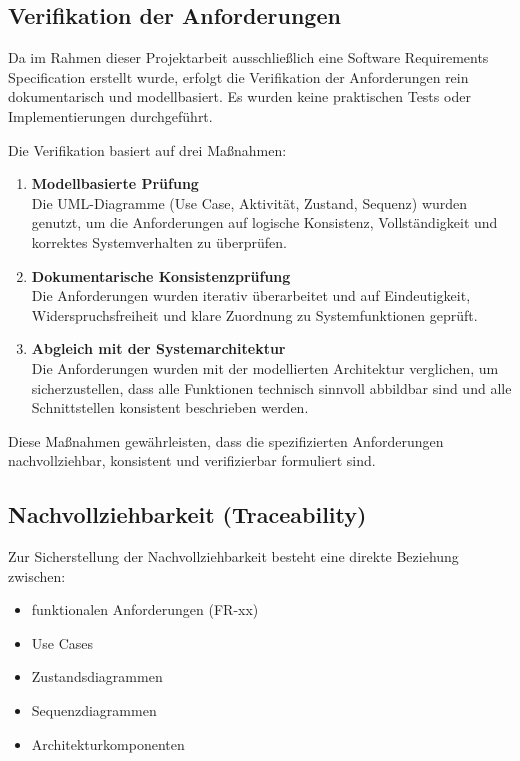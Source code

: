 \subsection{Verifikation der Anforderungen}

Da im Rahmen dieser Projektarbeit ausschließlich eine Software Requirements Specification erstellt wurde, erfolgt die Verifikation der Anforderungen rein dokumentarisch und modellbasiert. Es wurden keine praktischen Tests oder Implementierungen durchgeführt.

Die Verifikation basiert auf drei Maßnahmen:

\begin{enumerate}
    \item \textbf{Modellbasierte Prüfung}\\
    Die UML-Diagramme (Use Case, Aktivität, Zustand, Sequenz) wurden genutzt, um die Anforderungen auf logische Konsistenz, Vollständigkeit und korrektes Systemverhalten zu überprüfen.

    \item \textbf{Dokumentarische Konsistenzprüfung}\\
    Die Anforderungen wurden iterativ überarbeitet und auf Eindeutigkeit, Widerspruchsfreiheit und klare Zuordnung zu Systemfunktionen geprüft.

    \item \textbf{Abgleich mit der Systemarchitektur}\\
    Die Anforderungen wurden mit der modellierten Architektur verglichen, um sicherzustellen, dass alle Funktionen technisch sinnvoll abbildbar sind und alle Schnittstellen konsistent beschrieben werden.
\end{enumerate}

Diese Maßnahmen gewährleisten, dass die spezifizierten Anforderungen nachvollziehbar, konsistent und verifizierbar formuliert sind.

\subsection{Nachvollziehbarkeit (Traceability)}

Zur Sicherstellung der Nachvollziehbarkeit besteht eine direkte Beziehung zwischen:

\begin{itemize}
    \item funktionalen Anforderungen (FR-xx)
    \item Use Cases
    \item Zustandsdiagrammen
    \item Sequenzdiagrammen
    \item Architekturkomponenten
\end{itemize}

